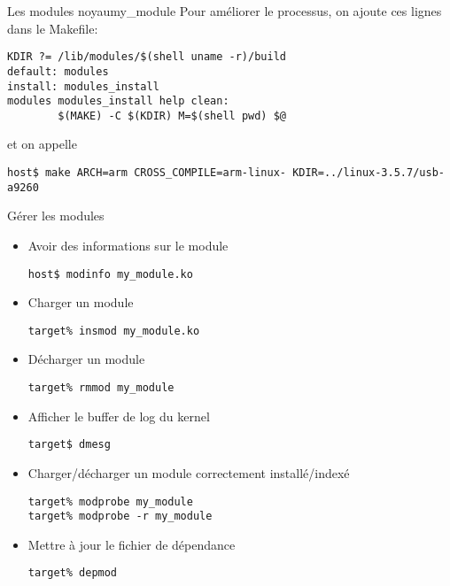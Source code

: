 \begin{frame}[fragile=singleslide]{Les modules noyau}{my\_module}
  Pour améliorer le processus, on ajoute ces lignes dans le Makefile:
  \begin{lstlisting}
KDIR ?= /lib/modules/$(shell uname -r)/build
default: modules
install: modules_install
modules modules_install help clean:
        $(MAKE) -C $(KDIR) M=$(shell pwd) $@
  \end{lstlisting}
  et on appelle
  \begin{lstlisting}
host$ make ARCH=arm CROSS_COMPILE=arm-linux- KDIR=../linux-3.5.7/usb-a9260 
  \end{lstlisting} %
\end{frame}

\begin{frame}[fragile=singleslide]{Gérer les modules}
  \begin{itemize} 
  \item Avoir des informations sur le module
    \begin{lstlisting}
host$ modinfo my_module.ko
    \end{lstlisting} %
  \item Charger un module
    \begin{lstlisting}
target% insmod my_module.ko
    \end{lstlisting} %
  \item Décharger un module
    \begin{lstlisting}
target% rmmod my_module
    \end{lstlisting}%
  \item Afficher le buffer de log du kernel
    \begin{lstlisting}
target$ dmesg
    \end{lstlisting} %
  \item Charger/décharger un module correctement installé/indexé
    \begin{lstlisting}
target% modprobe my_module
target% modprobe -r my_module
    \end{lstlisting} %
  \item Mettre à jour le fichier de dépendance
    \begin{lstlisting} 
target% depmod
    \end{lstlisting} %
  \end{itemize}
\end{frame}

